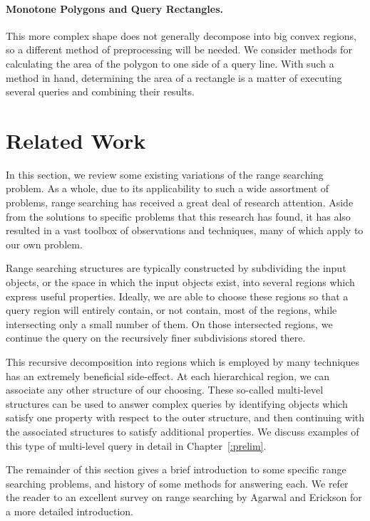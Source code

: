 \paragraph{Monotone Polygons and Query Rectangles.} This more complex shape does not generally decompose into big convex regions, so a different method of preprocessing will be needed.
We consider methods for calculating the area of the polygon to one side of a query line. 
With such a method in hand, determining the area of a rectangle is a matter of executing several queries and combining their results.

\section{Related Work}
\label{:intro:related}

In this section, we review some existing variations of the range searching problem.
As a whole, due to its applicability to such a wide assortment of problems, range searching has received a great deal of research attention.
Aside from the solutions to specific problems that this research has found, it has also resulted in a vast toolbox of observations and techniques, many of which apply to our own problem.

Range searching structures are typically constructed by subdividing the input objects, or the space in which the input objects exist, into several regions which express useful properties.
Ideally, we are able to choose these regions so that a query region will entirely contain, or not contain, most of the regions, while intersecting only a small number of them.
On those intersected regions, we continue the query on the recursively finer subdivisions stored there.\cite{Matousek93}

This recursive decomposition into regions which is employed by many techniques has an extremely beneficial side-effect. 
At each hierarchical region, we can associate any other structure of our choosing.
These so-called multi-level structures can be used to answer complex queries by identifying objects which satisfy one property with respect to the outer structure, and then continuing with the associated structures to satisfy additional properties.
We discuss examples of this type of multi-level query in detail in Chapter~\ref{:prelim}.

The remainder of this section gives a brief introduction to some specific range searching problems, and history of some methods for answering each. 
We refer the reader to an excellent survey on range searching by Agarwal and Erickson\cite{Agarwal99} for a more detailed introduction.


